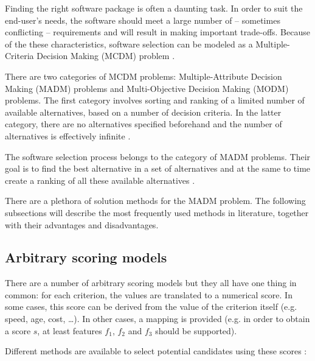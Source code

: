 Finding the right software package is often a daunting task. In order to suit the end-user's needs, the software should meet a large number of -- sometimes conflicting -- requirements and will result in making important trade-offs. Because of the these characteristics, software selection can be modeled as a Multiple-Criteria Decision Making (MCDM) problem \cite{Jadhav:2009, Jadhav:2011}.

There are two categories of MCDM problems: Multiple-Attribute Decision Making (MADM) problems and Multi-Objective Decision Making (MODM) problems. The first category involves sorting and ranking of a limited number of available alternatives, based on a number of decision criteria. In the latter category, there are no alternatives specified beforehand and the number of alternatives is effectively infinite \cite{Kahraman:2008}. 

The software selection process belongs to the category of MADM problems. Their goal is to find the best alternative in a set of alternatives and at the same to time create a ranking of all these available alternatives \TODO{\cite{}}. %

There are a plethora of solution methods for the MADM problem. The following subsections will describe the most frequently used methods in literature, together with their advantages and disadvantages. 


\subsection{Arbitrary scoring models} 

There are a number of arbitrary scoring models but they all have one thing in common: for each criterion, the values are translated to a numerical score. In some cases, this score can be derived from the value of the criterion itself (e.g. speed, age, cost, \ldots). In other cases, a mapping is provided (e.g. in order to obtain a score $s$, at least features $f_1$, $f_2$ and $f_3$ should be supported).

Different methods are available to select potential candidates using these scores \cite{Kahraman:2008}:

